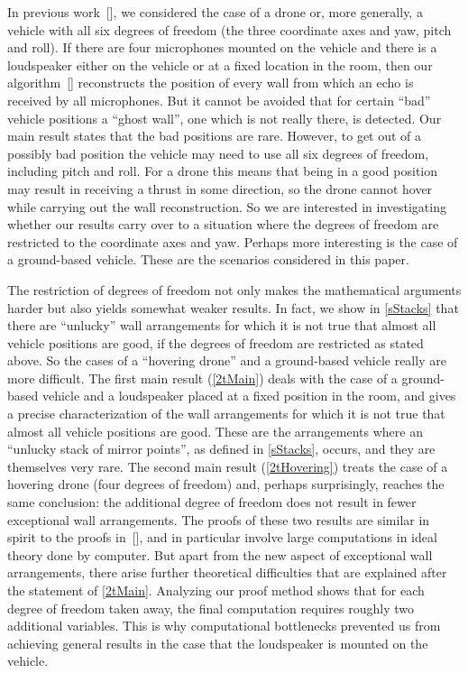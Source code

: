 \documentclass[reqno]{amsart}
\begin{document}
  




In previous work~[], we considered the case of a drone or, more generally, a vehicle with all six degrees of freedom (the three coordinate axes and yaw, pitch and roll). If there are four microphones mounted on the vehicle and there is a loudspeaker either on the vehicle or at a fixed location in the room, then our algorithm~[] reconstructs the position of every wall from which an echo is received by all microphones. But it cannot be avoided that for certain ``bad'' vehicle positions a ``ghost wall'', one which is not really there, is detected. Our main result states that the bad positions are rare. However, to get out of a possibly bad position the vehicle may need to use all six degrees of freedom, including pitch and roll. For a drone this means that being in a good position may result in receiving a thrust in some direction, so the drone cannot hover while carrying out the wall reconstruction. So we are interested in investigating whether our results carry over to a situation where the degrees of freedom are restricted to the coordinate axes and yaw. Perhaps more interesting is the case of a ground-based vehicle. These are the scenarios considered in this paper.

The restriction of degrees of freedom not only makes the mathematical arguments harder but also yields somewhat weaker results. In fact, we show in \cref{sStacks} that there are ``unlucky'' wall arrangements for which it is not true that almost all vehicle positions are good, if the degrees of freedom are restricted as stated above. So the cases of a ``hovering drone'' and a ground-based vehicle really are more difficult. The first main result (\cref{2tMain}) deals with the case of a ground-based vehicle and a loudspeaker placed at a fixed position in the room, and gives a precise characterization of the wall arrangements for which it is not true that almost all vehicle positions are good. These are the arrangements where an ``unlucky stack of mirror points'', as defined in \cref{sStacks}, occurs, and they are themselves very rare. The second main result (\cref{2tHovering}) treats the case of a hovering drone (four degrees of freedom) and, perhaps surprisingly, reaches the same conclusion: the additional degree of freedom does not result in fewer exceptional wall arrangements. The proofs of these two results are similar in spirit to the proofs in~[], and in particular involve large computations in ideal theory done by computer. But apart from the new aspect of exceptional wall arrangements, there arise further theoretical difficulties that are explained after the statement of \cref{2tMain}. Analyzing our proof method shows that for each degree of freedom taken away, the final computation requires roughly two additional variables. This is why computational bottlenecks prevented us from achieving general results in the case that the loudspeaker is mounted on the vehicle.
\end{document}
